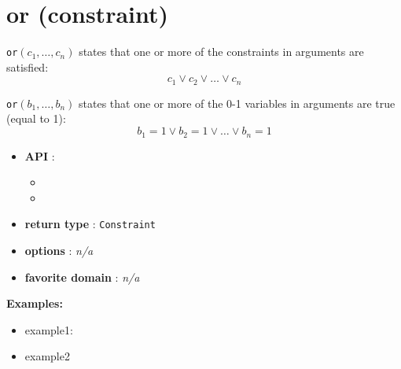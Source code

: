\label{or}
\hypertarget{or}{}

\section{or (constraint)}\label{or:orconstraint}\hypertarget{or:orconstraint}{}
\begin{notedef}
  \texttt{or}$(c_1,\ldots,c_n)$ states that one or more of the constraints in arguments are satisfied:
$$ c_1 \lor c_2 \lor\ldots\lor c_n$$

  \texttt{or}$(b_1,\ldots,b_n)$ states that one or more of the 0-1  variables in arguments are true (equal to 1):
$$ b_1=1 \lor b_2=1 \lor\ldots\lor b_n=1$$
\end{notedef}

\begin{itemize}
\item \textbf{API} : 
\begin{itemize}
\item {}
\item {}
\end{itemize}
	\item \textbf{return type} : \texttt{Constraint}
	\item \textbf{options} : \emph{n/a}
	\item \textbf{favorite domain} : \emph{n/a}
\end{itemize}

\textbf{Examples:}
\begin{itemize}
	\item example1:
\end{itemize}

\begin{itemize}
	\item example2
\end{itemize}

